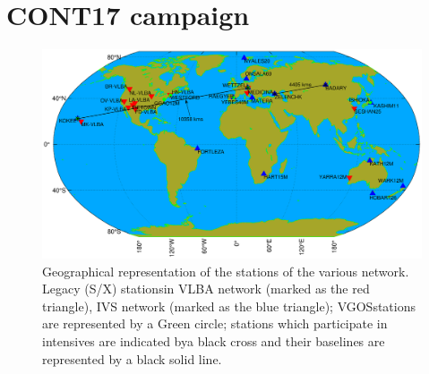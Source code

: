 \documentclass[smallextended]{svjour3}       %
\begin{document}
\section{CONT17 campaign}
\label{sec:1}
\begin{figure}
    \centering
    \includegraphics[scale=0.25]{VLBI_station_c.eps}
    \caption{Geographical representation of the stations of the various network. Legacy (S/X) stationsin VLBA network (marked as the red triangle), IVS network (marked as the blue triangle); VGOSstations are represented by a Green circle; stations which participate in intensives are indicated bya black cross and their baselines are represented by a black solid line. \citep{rauteffect}}
    \label{fig:cont17stations}
\end{figure}








\end{document}
